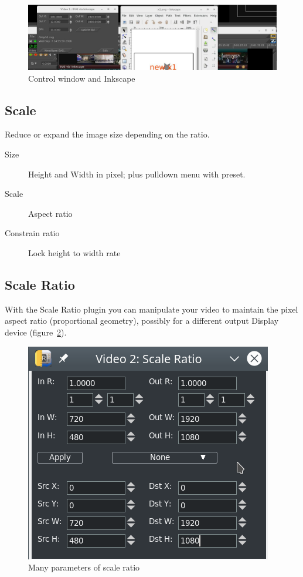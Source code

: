 \begin{figure}[hbtp]
    \centering
    \includegraphics[width=0.8\linewidth]{images/svg.png}
    \caption{Control window and Inkscape}
    \label{fig:svg}
\end{figure}

\subsection{Scale}%
\label{sub:scale}

Reduce or expand the image size depending on the ratio.

\begin{description}
    \item[Size] Height and Width in pixel; plus pulldown menu with preset.
    \item[Scale] Aspect ratio
    \item[Constrain ratio] Lock height to width rate
\end{description}

\subsection{Scale Ratio}%
\label{sub:scale_ratio}

With the Scale Ratio plugin you can manipulate your video to maintain the pixel aspect ratio (proportional geometry), possibly for a different output Display device (figure~\ref{fig:scaleratio}).

\begin{figure}[hbtp]
    \centering
    \includegraphics[width=0.6\linewidth]{images/scaleratio.png}
    \caption{Many parameters of scale ratio}
    \label{fig:scaleratio}
\end{figure}


